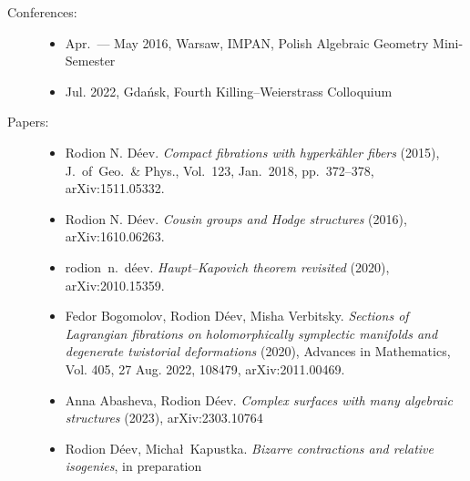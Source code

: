 \documentclass{article}
\begin{document}
\begin{description}

\item[Conferences:] \begin{itemize}
\item Apr.~--- May 2016,  Warsaw,  IMPAN,  Polish Algebraic Geometry Mini-Semester
\item Jul.  2022,  Gda\'nsk,  Fourth Killing--Weierstrass Colloquium
\end{itemize}


\item[Papers:] \begin{itemize}
     \item Rodion N. D\'eev. {\em 
     Compact fibrations with hyperk\"ahler fibers} (2015), J.~of~Geo.~\& Phys., 
     Vol.~123, Jan.~2018, pp.~372--378, arXiv:1511.05332.
     \item Rodion N. D\'eev. {\em
     Cousin groups and Hodge structures} (2016), arXiv:1610.06263.
     \item rodion~n.~d\'eev. {\em Haupt--Kapovich theorem revisited} (2020),
     arXiv:2010.15359.
     \item Fedor Bogomolov, Rodion D\'eev, Misha Verbitsky. {\em 
     Sections of Lagrangian fibrations on holomorphically symplectic manifolds 
     and degenerate twistorial deformations} (2020),  Advances in Mathematics, 
     Vol.  405,  27 Aug.  2022,  108479,  arXiv:2011.00469.
     \item Anna Abasheva,  Rodion D\'eev.  {\em Complex surfaces with many 
     algebraic  structures} (2023),  arXiv:2303.10764
     \item Rodion D\'eev,  Micha\l~Kapustka.  {\em Bizarre contractions and 
     relative isogenies},  in preparation
\end{itemize}


\end{description}
\end{document}
